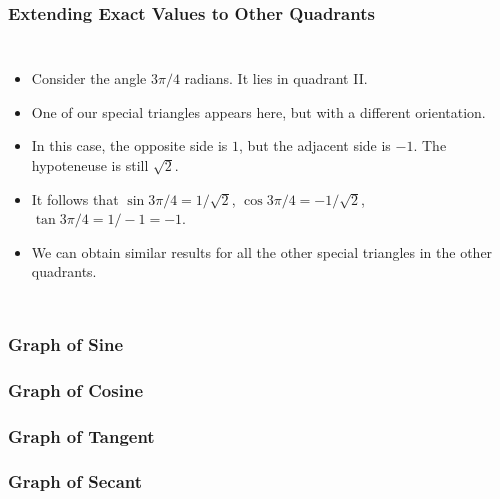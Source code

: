 \documentclass[serif,ignorenonframetext]{beamer}
\begin{document}

\begin{frame}
  \frametitle{Extending Exact Values to Other Quadrants}
  \begin{columns}
  \begin{itemize}[<+->]
  \item Consider the angle $3\pi/4$ radians.  It lies in quadrant II.
  \item One of our special triangles appears here, but with a
    different orientation.
  \item In this case, the opposite side is $1$, but the adjacent side
    is $-1$.  The hypoteneuse is still $\sqrt{2}$.
  \item It follows that $\sin 3\pi/4 = 1/\sqrt{2}$, $\cos 3\pi/4 =
    -1/\sqrt{2}$, $\tan 3\pi/4 = 1/-1 = -1$.
  \item We can obtain similar results for all the other special
    triangles in the other quadrants.
  \end{itemize}
  \end{columns}
\end{frame}

\begin{frame}
  \frametitle{Graph of Sine}
\end{frame}

\begin{frame}
  \frametitle{Graph of Cosine}
\end{frame}

\begin{frame}
  \frametitle{Graph of Tangent}
\end{frame}

\begin{frame}
  \frametitle{Graph of Secant}
\end{frame}
\end{document}
